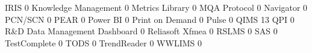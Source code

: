 \documentclass{article}
\begin{document}
\begin{Schunk}
\begin{Soutput}
  IRIS                                                                          0
  Knowledge Management                                                          0
  Metrics Library                                                               0
  MQA Protocol                                                                  0
  Navigator                                                                     0
  PCN/SCN                                                                       0
  PEAR                                                                          0
  Power BI                                                                      0
  Print on Demand                                                               0
  Pulse                                                                         0
  QIMS                                                                         13
  QPI                                                                           0
  R&D Data Management Dashboard                                                 0
  Reliasoft Xfmea                                                               0
  RSLMS                                                                         0
  SAS                                                                           0
  TestComplete                                                                  0
  TODS                                                                          0
  TrendReader                                                                   0
  WWLIMS                                                                        0
                                                           

\end{Soutput}
\end{Schunk}
\end{document}
